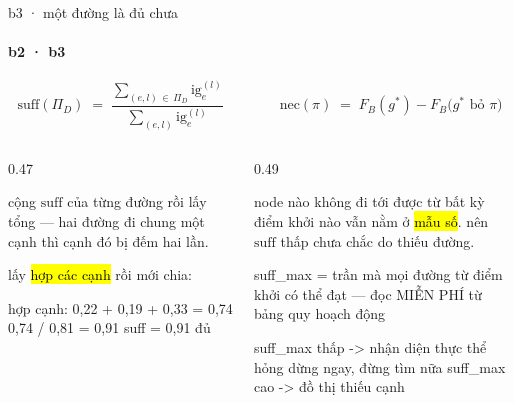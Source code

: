 \begin{frame}[fragile]{b3 · một đường là đủ chưa}
  \framesubtitle{b2 · b3}
  \[
    \mathrm{suff}(\Pi_D) \;=\;
    \frac{\sum_{(e,l) \,\in\, \Pi_D} \mathrm{ig}_e^{(l)}}
         {\sum_{(e,l)} \mathrm{ig}_e^{(l)}}
    \qquad\qquad
    \mathrm{nec}(\pi) \;=\; F_B(g^{*}) - F_B\bigl(g^{*} \text{ bỏ } \pi\bigr)
  \]

  \vspace{0.5em}
  \begin{columns}[t]
  \begin{column}{0.47\textwidth}
    \begin{keyb}[title={$\mathrm{suff}$ tính trên TOÀN tập đường}]
       cộng $\mathrm{suff}$ của từng đường rồi lấy tổng — hai đường đi
      chung một cạnh thì cạnh đó bị đếm hai lần.
      \vspace{0.3em}

      lấy \hl{hợp các cạnh} rồi mới chia:
      \begin{dia}
hợp cạnh: 0,22 + 0,19 + 0,33 = 0,74
          0,74 / 0,81 = 0,91
suff = 0,91      đủ
      \end{dia}
    \end{keyb}
  \end{column}
  \begin{column}{0.49\textwidth}
    \begin{bx}[title={$\mathrm{suff}$ thấp có HAI nguyên nhân khác hẳn nhau}]
      node nào không đi tới được từ bất kỳ điểm khởi nào vẫn nằm ở \hl{mẫu số}.
      nên $\mathrm{suff}$ thấp chưa chắc do thiếu đường.
      \vspace{0.25em}

      \begin{dia}
suff_max = trần mà mọi đường từ điểm khởi
           có thể đạt — đọc MIỄN PHÍ
           từ bảng quy hoạch động

suff_max thấp   -> nhận diện thực thể hỏng
                   dừng ngay, đừng tìm nữa
suff_max cao    -> đồ thị thiếu cạnh
      \end{dia}
    \end{bx}
  \end{column}
  \end{columns}
\end{frame}

